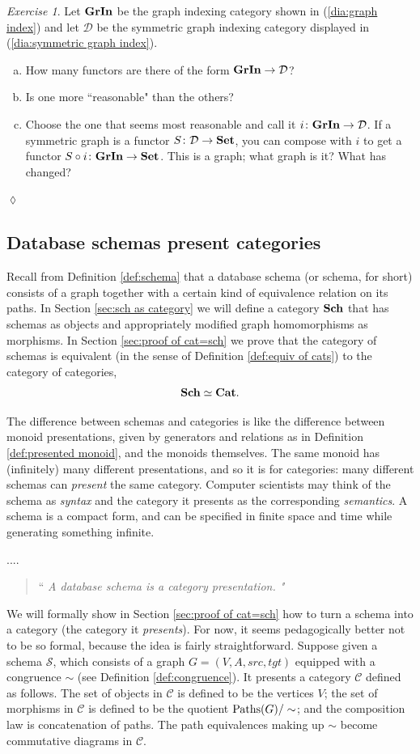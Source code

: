 \documentclass{book}
\def\tn{\textnormal}
\def\mc{\mathcal}
\def\Paths{\tn{Paths}}
\def\to{\rightarrow}
\def\taking{\colon}
\def\Cat{{\bf Cat}}
\def\Set{{\bf Set}}
\def\mcC{\mc{C}}
\def\mcD{\mc{D}}
\def\mcS{\mc{S}}
\theoremstyle{remark}
\newtheorem{exc}[subsubsection]{Exercise}
\newenvironment{exercise}{\begin{exc}}{\hspace*{\fill}$\lozenge$\end{exc}}
\newenvironment{slogan}{\addtocounter{subsubsection}{1}\vspace{.1in}\begin{sloppypar}\noindent{\em Slogan}\;\arabic{chapter}.\arabic{section}.\arabic{subsection}.\arabic{subsubsection}. \begin{quote}``\slshape}{"\end{quote}\end{sloppypar}\vspace{.1in}}
\theoremstyle{definition}
\def\Sch{{\bf Sch}}
\def\GrIn{{\bf GrIn}}
\def\sexc{\begin{enumerate}[a.)]\setlength{\itemsep}{.1cm}\setlength{\parskip}{.1cm}\item}
\def\next{\item}
\def\endsexc{\end{enumerate}}
\begin{document}
\begin{exercise}
Let $\GrIn$ be the graph indexing category shown in (\ref{dia:graph index}) and let $\mcD$ be the symmetric graph indexing category displayed in (\ref{dia:symmetric graph index}).
\sexc How many functors are there of the form $\GrIn\to\mcD$?
\next Is one more ``reasonable" than the others? 
\next Choose the one that seems most reasonable and call it $i\taking\GrIn\to\mcD$. If a symmetric graph is a functor $S\taking\mcD\to\Set$, you can compose with $i$ to get a functor $S\circ i\taking\GrIn\to\Set$. This is a graph; what graph is it? What has changed?
\endsexc
\end{exercise}


\subsection{Database schemas present categories}\label{sec:schemas and cats intro}

Recall from Definition \ref{def:schema} that a database schema (or schema, for short) consists of a graph together with a certain kind of equivalence relation on its paths. In Section \ref{sec:sch as category} we will define a category $\Sch$ that has schemas as objects and appropriately modified graph homomorphisms as morphisms. In Section \ref{sec:proof of cat=sch} we prove that the category of schemas is equivalent (in the sense of Definition \ref{def:equiv of cats}) to the category of categories, $$\Sch\simeq\Cat.$$

The difference between schemas and categories is like the difference between monoid presentations, given by generators and relations as in Definition \ref{def:presented monoid}, and the monoids themselves. The same monoid has (infinitely) many different presentations, and so it is for categories: many different schemas can {\em present} the same category. Computer scientists may think of the schema as {\em syntax} and the category it presents as the corresponding {\em semantics}. A schema is a compact form, and can be specified in finite space and time while generating something infinite. 

\begin{slogan}
A database schema is a category presentation.
\end{slogan}

We will formally show in Section \ref{sec:proof of cat=sch} how to turn a schema into a category (the category it {\em presents}). For now, it seems pedagogically better not to be so formal, because the idea is fairly straightforward. Suppose given a schema $\mcS$, which consists of a graph $G=(V,A,src,tgt)$ equipped with a congruence $\sim$ (see Definition \ref{def:congruence}). It presents a category $\mcC$ defined as follows. The set of objects in $\mcC$ is defined to be the vertices $V$; the set of morphisms in $\mcC$ is defined to be the quotient $\Paths(G)/\sim$; and the composition law is concatenation of paths. The path equivalences making up $\sim$ become commutative diagrams in $\mcC$.
\end{document}
